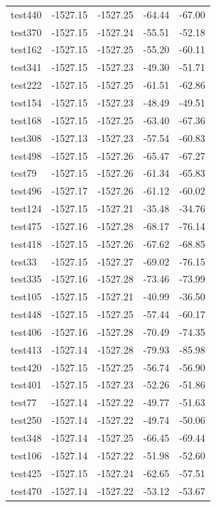 \documentclass[journal=jacsat,manuscript=article]{achemso}
\begin{document}
\begin{table}[b!]
\begin{tabular}{lrrrr}
test440 &  -1527.15 &  -1527.25 &  -64.44 &  -67.00 \\
test370 &  -1527.15 &  -1527.24 &  -55.51 &  -52.18 \\
test162 &  -1527.15 &  -1527.25 &  -55.20 &  -60.11 \\
test341 &  -1527.15 &  -1527.23 &  -49.30 &  -51.71 \\
test222 &  -1527.15 &  -1527.25 &  -61.51 &  -62.86 \\
test154 &  -1527.15 &  -1527.23 &  -48.49 &  -49.51 \\
test168 &  -1527.15 &  -1527.25 &  -63.40 &  -67.36 \\
test308 &  -1527.13 &  -1527.23 &  -57.54 &  -60.83 \\
test498 &  -1527.15 &  -1527.26 &  -65.47 &  -67.27 \\
test79  &  -1527.15 &  -1527.26 &  -61.34 &  -65.83 \\
test496 &  -1527.17 &  -1527.26 &  -61.12 &  -60.02 \\
test124 &  -1527.15 &  -1527.21 &  -35.48 &  -34.76 \\
test475 &  -1527.16 &  -1527.28 &  -68.17 &  -76.14 \\
test418 &  -1527.15 &  -1527.26 &  -67.62 &  -68.85 \\
test33  &  -1527.15 &  -1527.27 &  -69.02 &  -76.15 \\
test335 &  -1527.16 &  -1527.28 &  -73.46 &  -73.99 \\
test105 &  -1527.15 &  -1527.21 &  -40.99 &  -36.50 \\
test448 &  -1527.15 &  -1527.25 &  -57.44 &  -60.17 \\
test406 &  -1527.16 &  -1527.28 &  -70.49 &  -74.35 \\
test413 &  -1527.14 &  -1527.28 &  -79.93 &  -85.98 \\
test420 &  -1527.15 &  -1527.25 &  -56.74 &  -56.90 \\
test401 &  -1527.15 &  -1527.23 &  -52.26 &  -51.86 \\
test77  &  -1527.14 &  -1527.22 &  -49.77 &  -51.63 \\
test250 &  -1527.14 &  -1527.22 &  -49.74 &  -50.06 \\
test348 &  -1527.14 &  -1527.25 &  -66.45 &  -69.44 \\
test106 &  -1527.14 &  -1527.22 &  -51.98 &  -52.60 \\
test425 &  -1527.15 &  -1527.24 &  -62.65 &  -57.51 \\
test470 &  -1527.14 &  -1527.22 &  -53.12 &  -53.67 \\

\end{tabular}
\end{table}
\end{document}

